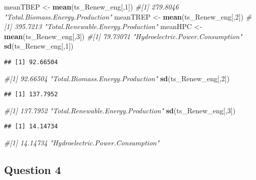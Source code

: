 \documentclass[
]{article}
\newenvironment{Shaded}{\begin{snugshade}}{\end{snugshade}}
\newcommand{\CommentTok}[1]{\textcolor[rgb]{0.56,0.35,0.01}{\textit{#1}}}
\newcommand{\DecValTok}[1]{\textcolor[rgb]{0.00,0.00,0.81}{#1}}
\newcommand{\FunctionTok}[1]{\textcolor[rgb]{0.13,0.29,0.53}{\textbf{#1}}}
\newcommand{\NormalTok}[1]{#1}
\newcommand{\OtherTok}[1]{\textcolor[rgb]{0.56,0.35,0.01}{#1}}
\begin{document}
\begin{Shaded}
\begin{Highlighting}[]
\NormalTok{meanTBEP }\OtherTok{\textless{}{-}} \FunctionTok{mean}\NormalTok{(ts\_Renew\_eng[,}\DecValTok{1}\NormalTok{]) }
\CommentTok{\#[1] 279.8046 "Total.Biomass.Energy.Production"}
\NormalTok{meanTREP }\OtherTok{\textless{}{-}} \FunctionTok{mean}\NormalTok{(ts\_Renew\_eng[,}\DecValTok{2}\NormalTok{])}
\CommentTok{\#[1] 395.7213 "Total.Renewable.Energy.Production"}
\NormalTok{meanHPC }\OtherTok{\textless{}{-}} \FunctionTok{mean}\NormalTok{(ts\_Renew\_eng[,}\DecValTok{3}\NormalTok{])}
\CommentTok{\#[1] 79.73071 "Hydroelectric.Power.Consumption"}
\FunctionTok{sd}\NormalTok{(ts\_Renew\_eng[,}\DecValTok{1}\NormalTok{])}
\end{Highlighting}
\end{Shaded}

\begin{verbatim}
## [1] 92.66504
\end{verbatim}

\begin{Shaded}
\begin{Highlighting}[]
\CommentTok{\#[1] 92.66504 "Total.Biomass.Energy.Production"}
\FunctionTok{sd}\NormalTok{(ts\_Renew\_eng[,}\DecValTok{2}\NormalTok{])}
\end{Highlighting}
\end{Shaded}

\begin{verbatim}
## [1] 137.7952
\end{verbatim}

\begin{Shaded}
\begin{Highlighting}[]
\CommentTok{\#[1] 137.7952 "Total.Renewable.Energy.Production"}
\FunctionTok{sd}\NormalTok{(ts\_Renew\_eng[,}\DecValTok{3}\NormalTok{])}
\end{Highlighting}
\end{Shaded}

\begin{verbatim}
## [1] 14.14734
\end{verbatim}

\begin{Shaded}
\begin{Highlighting}[]
\CommentTok{\#[1] 14.14734 "Hydroelectric.Power.Consumption"}
\end{Highlighting}
\end{Shaded}

\hypertarget{question-4}{%
\subsection{Question 4}\label{question-4}}
\end{document}
